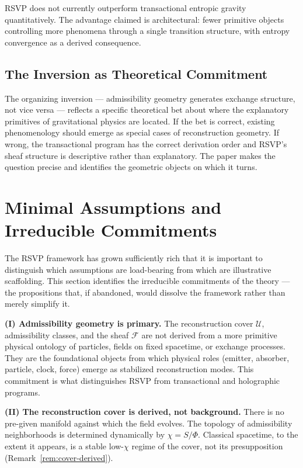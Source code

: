 \documentclass[11pt, a4paper]{article}
\theoremstyle{plain}
\theoremstyle{definition}
\theoremstyle{remark}
\newcommand{\sheaf}{\mathcal{F}}
\newcommand{\Ucover}{\mathcal{U}}
\begin{document}
RSVP does not currently outperform transactional entropic gravity quantitatively. The
advantage claimed is architectural: fewer primitive objects controlling more phenomena
through a single transition structure, with entropy convergence as a derived
consequence.

\subsection{The Inversion as Theoretical Commitment}

The organizing inversion --- admissibility geometry generates exchange structure, not
vice versa --- reflects a specific theoretical bet about where the explanatory
primitives of gravitational physics are located. If the bet is correct, existing
phenomenology should emerge as special cases of reconstruction geometry. If wrong,
the transactional program has the correct derivation order and RSVP's sheaf structure
is descriptive rather than explanatory. The paper makes the question precise and
identifies the geometric objects on which it turns.

\section{Minimal Assumptions and Irreducible Commitments}
\label{sec:assumptions}

The RSVP framework has grown sufficiently rich that it is important to distinguish
which assumptions are load-bearing from which are illustrative scaffolding. This
section identifies the irreducible commitments of the theory --- the propositions
that, if abandoned, would dissolve the framework rather than merely simplify it.

\medskip
\noindent\textbf{(I) Admissibility geometry is primary.}
The reconstruction cover $\Ucover$, admissibility classes, and the sheaf $\sheaf$
are not derived from a more primitive physical ontology of particles, fields on fixed
spacetime, or exchange processes. They are the foundational objects from which
physical roles (emitter, absorber, particle, clock, force) emerge as stabilized
reconstruction modes. This commitment is what distinguishes RSVP from transactional
and holographic programs.

\medskip
\noindent\textbf{(II) The reconstruction cover is derived, not background.}
There is no pre-given manifold against which the field evolves. The topology of
admissibility neighborhoods is determined dynamically by $\chi = S/\Phi$. Classical
spacetime, to the extent it appears, is a stable low-$\chi$ regime of the cover, not
its presupposition (Remark~\ref{rem:cover-derived}).
\end{document}
